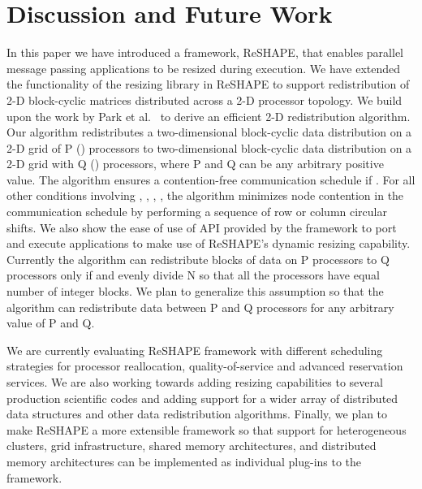 \documentclass[letterpaper]{llncs}
\newcommand{\reshape}{ReSHAPE}
\begin{document}
\section{Discussion and Future Work}
\label{sec:discussion}
In this paper we have introduced a framework, ReSHAPE,  that enables parallel message passing
applications to be resized during execution. 
We have extended the functionality of the resizing library in ReSHAPE to support redistribution of 2-D block-cyclic matrices distributed across a 2-D processor topology. 
We build upon the work by Park et al.~\cite{park} to derive an efficient 2-D redistribution algorithm. Our algorithm redistributes a two-dimensional block-cyclic data
distribution on a 2-D grid of P () processors to  two-dimensional block-cyclic data distribution
on a 2-D grid with Q () processors, where P and Q can be any  arbitrary positive value. 
The algorithm  ensures a contention-free communication schedule if  . 
For all other conditions involving , , , , the  algorithm minimizes node contention in the communication schedule by performing a sequence of row or column circular shifts.
We also show the ease of use of API provided by the framework to port and execute applications to make use of ReSHAPE's dynamic resizing capability.
Currently the algorithm can redistribute  blocks of data on P processors to Q processors only if  and  evenly divide N so that all the processors have equal number of integer blocks. We plan to generalize this assumption so that the algorithm can redistribute data between P and Q processors for any arbitrary value of P and Q. 

We are currently evaluating \reshape{} framework with
different scheduling strategies for processor reallocation,
quality-of-service and advanced reservation services. We are also 
working towards adding resizing capabilities to several production scientific codes and
adding support for a wider array of distributed data structures and other data
redistribution algorithms.
Finally, we plan to make \reshape{} a more extensible framework so
that support for heterogeneous clusters, grid infrastructure, shared memory
architectures, and distributed memory architectures can be implemented  as
individual plug-ins to the framework.




\end{document}
